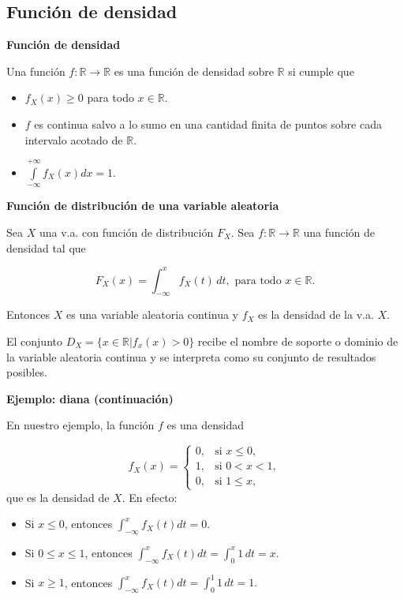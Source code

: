 \documentclass[
  letterpaper,
  DIV=11,
  numbers=noendperiod]{scrreprt}
\providecommand{\tightlist}{%
  \setlength{\itemsep}{0pt}\setlength{\parskip}{0pt}}\usepackage{longtable,booktabs,array}
\begin{document}
\hypertarget{funciuxf3n-de-densidad}{%
\subsection{Función de densidad}\label{funciuxf3n-de-densidad}}

\textbf{Función de densidad}

Una función \(f:\mathbb{R}\to\mathbb{R}\) es una función de densidad
sobre \(\mathbb{R}\) si cumple que

\begin{itemize}
\tightlist
\item
  \(f_{X}(x)\geq 0\) para todo \(x \in\mathbb{R}.\)
\item
  \(f\) es continua salvo a lo sumo en una cantidad finita de puntos
  sobre cada intervalo acotado de \(\mathbb{R}\).
\item
  \(\displaystyle\int\limits_{-\infty}^{+\infty} f_{X}(x) dx=1.\)
\end{itemize}

\textbf{Función de distribución de una variable aleatoria}

Sea \(X\) una v.a. con función de distribución \(F_X\). Sea
\(f:\mathbb{R}\to\mathbb{R}\) una función de densidad tal que

\[F_X(x)=\displaystyle\int_{-\infty}^{x} f_X(t)\,dt,\mbox{ para todo } x\in\mathbb{R}.\]

Entonces \(X\) es una variable aleatoria continua y \(f_X\) es la
densidad de la v.a. \(X\).

El conjunto \(D_X=\{x\in\mathbb{R}| f_x(x)>0\}\) recibe el nombre de
soporte o dominio de la variable aleatoria continua y se interpreta como
su conjunto de resultados posibles.

\textbf{Ejemplo: diana (continuación)}

En nuestro ejemplo, la función \(f\) es una densidad

\[
f_{X}(x)=\left\{
\begin{array}{ll}
0, & \mbox{si } x\leq 0,\\
1, & \mbox{si } 0 < x < 1,\\
0, & \mbox{si } 1\leq x,
\end{array}\right.
\] que es la densidad de \(X\). En efecto:

\begin{itemize}
\item
  Si \(x \leq 0\), entonces
  \(\displaystyle\int_{-\infty}^x f_X(t) dt = 0.\)
\item
  Si \(0\leq x\leq 1\), entonces
  \(\displaystyle\int_{-\infty}^x f_X(t) dt = \int_0^x 1\, dt = x.\)
\item
  Si \(x\geq 1\), entonces
  \(\displaystyle\int_{-\infty}^x f_X(t) dt = \int_0^1 1\, dt = 1.\)
\end{itemize}
\end{document}
